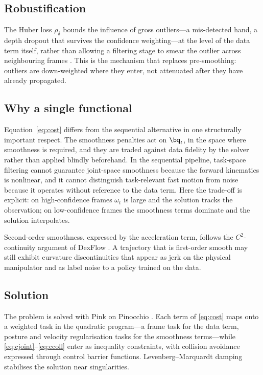 \subsection{Robustification}

The Huber loss $\rho_\delta$ bounds the influence of gross outliers---a
mis-detected hand, a depth dropout that survives the confidence weighting---at
the level of the data term itself, rather than allowing a filtering stage to
smear the outlier across neighbouring frames \cite{dexteleop0}. This is the
mechanism that replaces pre-smoothing: outliers are down-weighted where they
enter, not attenuated after they have already propagated.

\subsection{Why a single functional}

Equation~\eqref{eq:cost} differs from the sequential alternative in one
structurally important respect. The smoothness penalties act on $\bq_t$, in the
space where smoothness is required, and they are traded against data fidelity
by the solver rather than applied blindly beforehand. In the sequential
pipeline, task-space filtering cannot guarantee joint-space smoothness because
the forward kinematics is nonlinear, and it cannot distinguish task-relevant
fast motion from noise because it operates without reference to the data term.
Here the trade-off is explicit: on high-confidence frames $\omega_t$ is large
and the solution tracks the observation; on low-confidence frames the
smoothness terms dominate and the solution interpolates.

Second-order smoothness, expressed by the acceleration term, follows the
$C^2$-continuity argument of DexFlow \cite{dexflow}. A trajectory that is
first-order smooth may still exhibit curvature discontinuities that appear as
jerk on the physical manipulator and as label noise to a policy trained on the
data.

\subsection{Solution}

The problem is solved with Pink on Pinocchio \cite{pink}. Each term of
\eqref{eq:cost} maps onto a weighted task in the quadratic program---a frame
task for the data term, posture and velocity regularisation tasks for the
smoothness terms---while \eqref{eq:cjoint}--\eqref{eq:ccoll} enter as
inequality constraints, with collision avoidance expressed through control
barrier functions. Levenberg--Marquardt damping stabilises the solution near
singularities.

